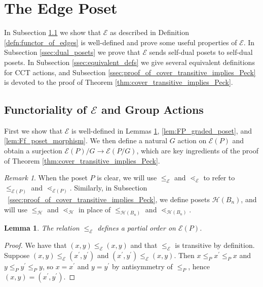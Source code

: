 \documentclass[smallextended, envcountsame, numbook]{svjour3}
\theoremstyle{plain}
\newtheorem{lem}[thm]{Lemma}
\theoremstyle{definition}
\theoremstyle{remark}
\newtheorem{rmk}[thm]{Remark}
\numberwithin{equation}{section}
\newcommand\ssec{\subsection}
\begin{document}

\section{The Edge Poset}
\label{sec:functor_of_edges}

In Subsection \ref{ssec:functoriality} we show that $\mathcal E$ as described in Definition \ref{defn:functor_of_edges} is well-defined and prove some useful properties of $\mathcal E$.  In Subsection \ref{ssec:dual_posets} we prove that $\mathcal{E}$ sends self-dual posets to self-dual posets.  In Subsection \ref{ssec:equivalent_defs} we give several equivalent definitions for CCT actions, and Subsection \ref{ssec:proof_of_cover_transitive_implies_Peck} is devoted to the proof of Theorem \ref{thm:cover_transitive_implies_Peck}.

\ssec{Functoriality of $\mathcal E$ and Group Actions}
\label{ssec:functoriality}
First we show that $\mathcal{E}$ is well-defined in Lemmas \ref{lem:f_partial_order}, \ref{lem:FP_graded_poset}, and \ref{lem:Ff_poset_morphism}.  We then define a natural $G$ action on $\mathcal E(P)$ and obtain a surjection $\mathcal E(P)/G\rightarrow \mathcal E(P/G)$, which are key ingredients of the proof of Theorem \ref{thm:cover_transitive_implies_Peck}.

\begin{rmk}
When the poset $P$ is clear, we will use $\leq_{\mathcal E}$ and $\lessdot_{\mathcal E}$ to refer to $\leq_{\mathcal E(P)}$ and $\lessdot_{\mathcal E(P)}$. Similarly, in Subsection ~\ref{ssec:proof_of_cover_transitive_implies_Peck}, we define posets $\mathcal H(B_n)$, and will use $\leq_{\mathcal H}$ and $\lessdot_{\mathcal H}$ in place of $\leq_{\mathcal H(B_n)}$ and $\lessdot_{\mathcal H(B_n)}$.
\end{rmk}

\begin{lem}\label{lem:f_partial_order}
The relation $\le_{\mathcal E}$ defines a partial order on $\mathcal E(P)$.
\end{lem}

\begin{proof}
We have that $(x, y)\le_{\mathcal E} (x, y)$ and that $\le_{\mathcal E}$ is transitive by definition.  Suppose $(x, y)\le_{\mathcal E} (x^\prime, y^\prime)$ and $(x^\prime, y^\prime)\le_{\mathcal E} (x, y)$.  Then $x\le_P x^\prime \le_P x$ and $y\le_P y^\prime \le_P y$, so $x = x^\prime$ and $y=y^\prime$ by antisymmetry of $\le_P$, hence $(x, y) = (x^\prime, y^\prime)$.
\end{proof}
\end{document}
